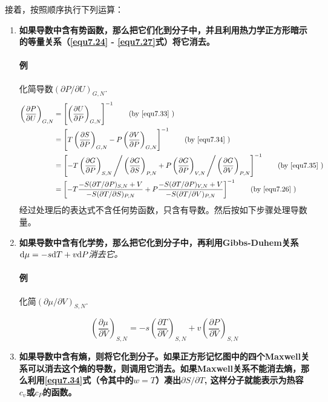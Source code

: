 接着，按照顺序执行下列运算：

\begin{enumerate}
\item {\bf 如果导数中含有势函数，那么把它们化到分子中，并且利用热力学正方形暗示的等量关系（\eqref{equ7.24} - \eqref{equ7.27}式）将它消去。}
\paragraph{例} 化简导数$(\partial P / \partial U)_{G, N}$.
\begin{align}
	\left( \frac{\partial P}{\partial U} \right)_{G, N} &= \left[ \left( \frac{\partial U}{\partial P} \right)_{G, N} \right]^{-1} \tag{by \eqref{equ7.33} } \\
	&= \left[ T \left( \frac{\partial S}{\partial P} \right)_{G, N} - P \left( \frac{\partial V}{\partial P} \right)_{G, N} \right]^{-1} \tag{by \eqref{equ7.34} }  \\
	&= \left[ -T \left( \frac{\partial G}{\partial P} \right)_{S, N} \Bigg/ \left( \frac{\partial G}{\partial S} \right)_{P, N} + P \left( \frac{\partial G}{\partial P} \right)_{V, N} \Bigg/ \left( \frac{\partial G}{\partial V} \right)_{P, N} \right]^{-1} \tag{by \eqref{equ7.35} } \\
	&= \left[ -T \frac{-S (\partial T / \partial P)_{S, N} + V}{-S (\partial T / \partial S)_{P, N}} + P \frac{-S(\partial T / \partial P)_{V, N} + V}{-S (\partial T / \partial V)_{P, N}} \right]^{-1} \tag{by \eqref{equ7.26} }
\end{align}
经过处理后的表达式不含任何势函数，只含有导数。然后按如下步骤处理导数量。
\item {\bf 如果导数中含有化学势，那么把它化到分子中，再利用Gibbs-Duhem关系}$\mathrm{d} \mu = -s \mathrm{d} T + v\mathrm{d} P${\it 消去它。}

\paragraph{例} 化简$( \partial \mu / \partial V)_{S, N}$.

\[
	\left( \frac{\partial \mu}{\partial V} \right)_{S, N} = -s \left( \frac{\partial T}{\partial V} \right)_{S, N} + v \left( \frac{\partial P}{\partial V} \right)_{S, N}
\]
\item {\bf 如果导数中含有熵，则将它化到分子。如果正方形记忆图中的四个Maxwell关系可以消去这个熵的导数，则调用它消去。如果Maxwell关系不能消去熵，那么利用\eqref{equ7.34}式（令其中的$w = T$）凑出$\partial S / \partial T$, 这样分子就能表示为热容$c_v$或$c_P$的函数。}


\end{enumerate}
